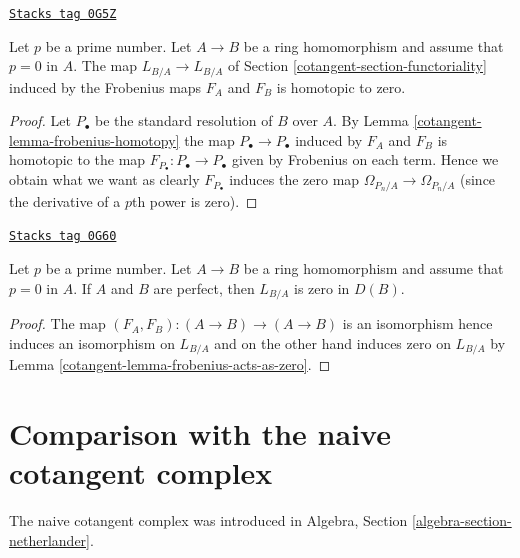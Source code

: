 \begin{lemma}
\label{cotangent-lemma-frobenius-acts-as-zero}
\href{https://stacks.math.columbia.edu/tag/0G5Z}{\texttt{Stacks tag 0G5Z}}

Let $p$ be a prime number. Let $A \to B$ be a ring homomorphism
and assume that $p = 0$ in $A$. The map $L_{B/A} \to L_{B/A}$
of Section \ref{cotangent-section-functoriality} induced by the
Frobenius maps $F_A$ and $F_B$ is homotopic to zero.
\end{lemma}

\begin{proof}

Let $P_\bullet$ be the standard resolution of $B$ over $A$.
By Lemma \ref{cotangent-lemma-frobenius-homotopy} the map $P_\bullet \to P_\bullet$
induced by $F_A$ and $F_B$ is homotopic to the map
$F_{P_\bullet} : P_\bullet \to P_\bullet$ given by
Frobenius on each term. Hence we obtain what we want as clearly
$F_{P_\bullet}$ induces the zero map $\Omega_{P_n/A} \to \Omega_{P_n/A}$
(since the derivative of a $p$th power is zero).
\end{proof}

\begin{lemma}
\label{cotangent-lemma-perfect-zero}
\href{https://stacks.math.columbia.edu/tag/0G60}{\texttt{Stacks tag 0G60}}

Let $p$ be a prime number. Let $A \to B$ be a ring homomorphism
and assume that $p = 0$ in $A$. If $A$ and $B$ are perfect, then
$L_{B/A}$ is zero in $D(B)$.
\end{lemma}

\begin{proof}

The map $(F_A, F_B) : (A \to B) \to (A \to B)$ is an isomorphism
hence induces an isomorphism on $L_{B/A}$ and on the other hand
induces zero on $L_{B/A}$ by Lemma \ref{cotangent-lemma-frobenius-acts-as-zero}.
\end{proof}

\section{Comparison with the naive cotangent complex}
\label{cotangent-section-surjections}
The naive cotangent complex was introduced in
Algebra, Section \ref{algebra-section-netherlander}.

